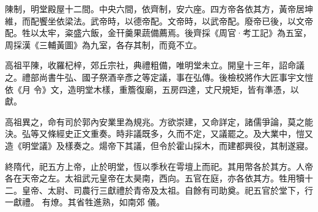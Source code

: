 \begin{pinyinscope}
 陳制，明堂殿屋十二間。中央六間，依齊制，安六座。四方帝各依其方，黃帝居坤維，而配饗坐依梁法。武帝時，以德帝配。文帝時，以武帝配。廢帝已後，以文帝配。牲以太牢，粢盛六飯，金幵羹果蔬備薦焉。後齊採《周官·考工記》為五室，周採漢《三輔黃圖》為九室，各存其制，而竟不立。



 高祖平陳，收羅杞梓，郊丘宗社，典禮粗備，唯明堂未立。開皇十三年，詔命議之。禮部尚書牛弘、國子祭酒辛彥之等定議，事在弘傳。後檢校將作大匠事宇文愷依《月
 令》文，造明堂木樣，重簷復廟，五房四達，丈尺規矩，皆有準憑，以獻。



 高祖異之，命有司於郭內安業里為規兆。方欲崇建，又命詳定，諸儒爭論，莫之能決。弘等又條經史正文重奏。時非議既多，久而不定，又議罷之。及大業中，愷又造《明堂議》及樣奏之。煬帝下其議，但令於霍山採木，而建都興役，其制遂寢。



 終隋代，祀五方上帝，止於明堂，恆以季秋在雩壇上而祀。其用幣各於其方。人帝各在天帝之左。太祖武元皇帝在太昊南，西向。五官在庭，亦各依其方。牲用犢十二。皇帝、太尉、司農行三獻禮於青帝及太祖。自餘有司助奠。祀五官於堂下，行一獻禮。
 有燎。其省牲進熟，如南郊
 儀。



\end{pinyinscope}